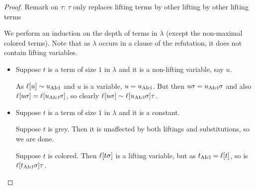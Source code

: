 \documentclass[,%
	paper=a4,%
	DIV14, %
	twoside=false,%
	liststotoc,
	bibtotoc,
	draft=false,%
	numbers=noendperiod
]{scrartcl}
\begin{document}
\begin{proof}
	Remark on $\tau$: $\tau$ only replaces lifting terms by other lifting by other lifting terms

	We perform an induction on the depth of terms in $\lambda$ (except the non-maximal colored terms). Note that as $\lambda$ occurs in a clause of the refutation, it does not contain lifting variables.
	\begin{itemize}
			\begin{comment} NO LIFTING VARS!
			\item Suppose $t$ is a term of size $1$ in $\lambda$ and it is a lifting variable, say $z_i$.
				Then by Lemma~\ref{lemma:no_lifting_vars_in_subst}, $t\sigma = t$ and also $\lifboth{t\sigma} = t$.

				As by the induction hypothesis $t\fromclause \sim \lifboth{t}$, $t\fromclause =z_j$ for some $j$.
				Hence, $\lifboth{t\cl\sigma} = t\cl$.
				By the remark on~$\tau$,
				$\lifboth{t\sigma} \sim \lifboth{t\cl\sigma}\tau$.
			\end{comment}

		\item Suppose $t$ is a term of size $1$ in $\lambda$ and it is a non-lifting variable, say $u$.

			As $\ell[u]\sim u_{\operatorname{AIcl}}$ and $u$ is a variable, $u = u_{\operatorname{AIcl}}$.
			But then $u\sigma = u_{\operatorname{AIcl}}\sigma$ and also $\ell[u \sigma] = \ell[u_{\operatorname{AIcl}}\sigma]$, so clearly 
			$\ell[u\sigma] \sim \ell[u_{\operatorname{AIcl}}\sigma]\tau$.



		\item Suppose $t$ is a term of size $1$ in $\lambda$ and it is a constant.

			Suppose $t$ is grey. Then it is unaffected by both liftings and substitutions, so we are done.

			Suppose $t$ is colored.
			Then $\ell[t\sigma]$ is a lifting variable, but 
			as $t_{\operatorname{AIcl}} = \ell[t]$, so is $\ell[t_{\operatorname{AIcl}}\sigma]\tau$.


\end{itemize}
\end{proof}
\end{document}
